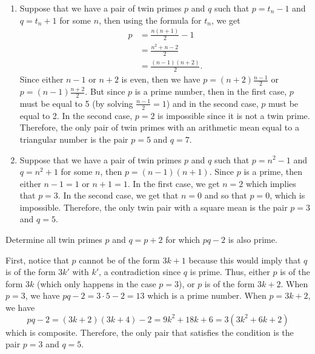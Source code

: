 \begin{solution}
    \begin{enumerate}
        \item Suppose that we have a pair of twin primes $p$ and $q$ such that $p = t_n - 1$ and $q = t_n + 1$ for some $n$, then using the formula for $t_n$, we get
        \begin{align*}
            p &= \frac{n(n+1)}{2} - 1\\
            &= \frac{n^2 + n - 2}{2} \\
            &= \frac{(n-1)(n+2)}{2}.
        \end{align*}
        Since either $n-1$ or $n+2$ is even, then we have $p = (n+2)\frac{n-1}{2}$ or $p = (n-1)\frac{n+2}{2}$. But since $p$ is a prime number, then in the first case, $p$ must be equal to 5 (by solving $\frac{n-1}{2} = 1$) and in the second case, $p$ must be equal to 2. In the second case, $p = 2$ is impossible since it is not a twin prime. Therefore, the only pair of twin primes with an arithmetic mean equal to a triangular number is the pair $p = 5$ and $q = 7$.
        \item Suppose that we have a pair of twin primes $p$ and $q$ such that $p = n^2- 1$ and $q = n^2 + 1$ for some $n$, then $p = (n-1)(n+1)$. Since $p$ is a prime, then either $n-1 = 1$ or $n + 1 = 1$. In the first case, we get $n = 2$ which implies that $p = 3$. In the second case, we get that $n = 0$ and so that $p = 0$, which is impossible. Therefore, the only twin pair with a square mean is the pair $p = 3$ and $q = 5$.
    \end{enumerate}
\end{solution}

\begin{exercise}
    Determine all twin primes $p$ and $q = p+2$ for which $pq - 2$ is also prime. \\
\end{exercise}

\begin{solution}
    First, notice that $p$ cannot be of the form $3k+1$ because this would imply that $q$ is of the form $3k'$ with $k'$, a contradiction since $q$ is prime. Thus, either $p$ is of the form $3k$ (which only happens in the case $p = 3$), or $p$ is of the form $3k+2$. When $p = 3$, we have $pq - 2 = 3\cdot 5 - 2 = 13$ which is a prime number. When $p = 3k+2$, we have
    $$pq - 2 = (3k+2)(3k+4) - 2 = 9k^2 + 18k + 6 = 3(3k^2 + 6k + 2)$$
    which is composite. Therefore, the only pair that satisfies the condition is the pair $p = 3$ and $q = 5$. \\
\end{solution}

